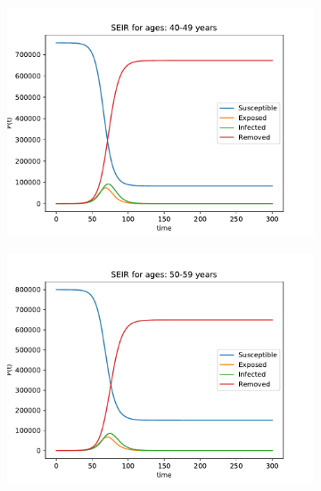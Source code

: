 \begin{figure}[H]
\begin{subfigure}{0.40\textwidth}
\includegraphics[width = \textwidth]{../fig/SEIR_40-49_q.pdf}
\caption{\protect}
\end{subfigure}
\begin{subfigure}{0.40\textwidth}
\includegraphics[width = \textwidth]{../fig/SEIR_50-59_q.pdf}
\caption{\protect}
\end{subfigure}
\begin{subfigure}{0.40\textwidth}

\end{subfigure}
\end{figure}
